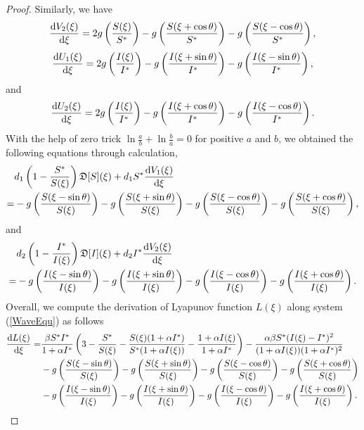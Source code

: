 \documentclass[final,3p,times]{elsarticle}
\numberwithin{equation}{section}
\def\d {{\rm d}}
\begin{document}
\begin{proof}
Similarly, we have
\[
\frac{\d V_2(\xi)}{\d \xi} = 2 g\left(\frac{S(\xi)}{S^*}\right) - g\left(\frac{S(\xi+\cos\theta)}{S^*}\right) - g\left(\frac{S(\xi-\cos\theta)}{S^*}\right),
\]
\[
\frac{\d U_1(\xi)}{\d \xi} = 2 g\left(\frac{I(\xi)}{I^*}\right) - g\left(\frac{I(\xi+\sin\theta)}{I^*}\right) - g\left(\frac{I(\xi-\sin\theta)}{I^*}\right),
\]
and
\[
\frac{\d U_2(\xi)}{\d \xi} = 2 g\left(\frac{I(\xi)}{I^*}\right) - g\left(\frac{I(\xi+\cos\theta)}{I^*}\right) - g\left(\frac{I(\xi-\cos\theta)}{I^*}\right).
\]
With the help of zero trick $\ln \frac{a}{b} + \ln \frac{b}{a} = 0$ for positive $a$ and $b$, we obtained the following equations through calculation,
\begin{align*}
&d_1 \left(1-\frac{S^*}{S(\xi)}\right) \mathfrak{D}[S](\xi) + d_1 S^* \frac{\d V_1(\xi)}{\d \xi}\\
= & -g\left(\frac{S(\xi-\sin\theta)}{S(\xi)}\right) -g\left(\frac{S(\xi+\sin\theta)}{S(\xi)}\right) -g\left(\frac{S(\xi-\cos\theta)}{S(\xi)}\right) -g\left(\frac{S(\xi+\cos\theta)}{S(\xi)}\right),
\end{align*}
and
\begin{align*}
&d_2 \left(1-\frac{I^*}{I(\xi)}\right) \mathfrak{D}[I](\xi) + d_2 I^* \frac{\d V_2(\xi)}{\d \xi}\\
= & -g\left(\frac{I(\xi-\sin\theta)}{I(\xi)}\right) -g\left(\frac{I(\xi+\sin\theta)}{I(\xi)}\right) -g\left(\frac{I(\xi-\cos\theta)}{I(\xi)}\right) -g\left(\frac{I(\xi+\cos\theta)}{I(\xi)}\right).
\end{align*}
Overall, we compute the derivation of Lyapunov function $L(\xi)$ along system (\ref{WaveEqu}) as follows
\begin{align*}
\frac{\d L(\xi)}{\d \xi} = &\frac{\beta S^*I^*}{1+\alpha I^*}\left(3 - \frac{S^*}{S(\xi)} - \frac{S(\xi)(1+\alpha I^*)}{S^* (1+\alpha I(\xi))} - \frac{1+\alpha I(\xi)}{1+\alpha I^*}\right) - \frac{\alpha \beta S^* (I(\xi)-I^*)^2}{(1+\alpha I(\xi))(1+\alpha I^*)^2}\\
&-g\left(\frac{S(\xi-\sin\theta)}{S(\xi)}\right) -g\left(\frac{S(\xi+\sin\theta)}{S(\xi)}\right) -g\left(\frac{S(\xi-\cos\theta)}{S(\xi)}\right) -g\left(\frac{S(\xi+\cos\theta)}{S(\xi)}\right)\\
&-g\left(\frac{I(\xi-\sin\theta)}{I(\xi)}\right) -g\left(\frac{I(\xi+\sin\theta)}{I(\xi)}\right) -g\left(\frac{I(\xi-\cos\theta)}{I(\xi)}\right) -g\left(\frac{I(\xi+\cos\theta)}{I(\xi)}\right).
\end{align*}
\end{proof}
\end{document}
